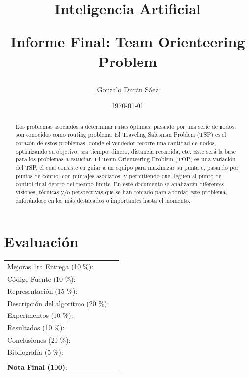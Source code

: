 \documentclass[letter, 10pt]{article}
\begin{document}
\title{Inteligencia Artificial \\ \begin{Large}Informe Final: Team Orienteering Problem\end{Large}}
\author{Gonzalo Durán Sáez}
\date{\today}
\maketitle


\section*{Evaluaci\'on}

\begin{tabular}{ll}
Mejoras 1ra Entrega (10 \%): &  \underline{\hspace{2cm}}\\
C\'odigo Fuente (10 \%): &  \underline{\hspace{2cm}}\\
Representaci\'on (15 \%):  & \underline{\hspace{2cm}} \\
Descripci\'on del algoritmo (20 \%):  & \underline{\hspace{2cm}} \\
Experimentos (10 \%):  & \underline{\hspace{2cm}} \\
Resultados (10 \%):  & \underline{\hspace{2cm}} \\
Conclusiones (20 \%): &  \underline{\hspace{2cm}}\\
Bibliograf\'ia (5 \%): & \underline{\hspace{2cm}}\\
 &  \\
\textbf{Nota Final (100)}:   & \underline{\hspace{2cm}}
\end{tabular}

\begin{abstract}
Los problemas asociados a determinar rutas \'optimas, pasando por una serie de nodos, son conocidos como routing problems. El Traveling Salesman Problem (TSP) es el coraz\'on de estos problemas, donde el vendedor recorre una cantidad de nodos, optimizando su objetivo, sea tiempo, dinero, distancia recorrida, etc. Este será la base para los problemas a estudiar.
El Team Orienteering Problem (TOP) es una variación del TSP, el cual consiste en guiar a un equipo para maximizar su puntaje, pasando por puntos de control con puntajes asociados, y permitiendo que lleguen al punto de control final dentro del tiempo límite. En este documento se analizarán diferentes visiones, técnicas y/o perspectivas que se han tomado para abordar este problema, enfocándose en los más destacados o importantes hasta el momento.
\end{abstract}
\end{document}

